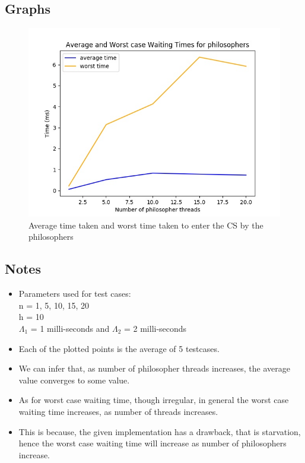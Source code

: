 \documentclass[12pt]{article}
\begin{document}
\subsection{Graphs}
\begin{figure}[ht!]
\includegraphics[width=150mm]{graph.jpg}
\caption{Average time taken and worst time taken to enter the CS by the philosophers}
\end{figure}

\newpage

\subsection{Notes}
\begin{itemize}
\item Parameters used for test cases:\\
n = 1, 5, 10, 15, 20\\
h = 10\\
$\Lambda _1$ = 1 milli-seconds and $\Lambda _2$ = 2 milli-seconds\\
\item Each of the plotted points is the average of 5 testcases.\\
\item We can infer that, as number of philosopher threads increases, the average value converges to some value.
\item As for worst case waiting time, though irregular, in general the worst case waiting time increases, as number of threads increases.
\item This is because, the given implementation has a drawback, that is starvation, hence the worst case waiting time will increase as number of philosophers increase.
\end{itemize}
\end{document}
